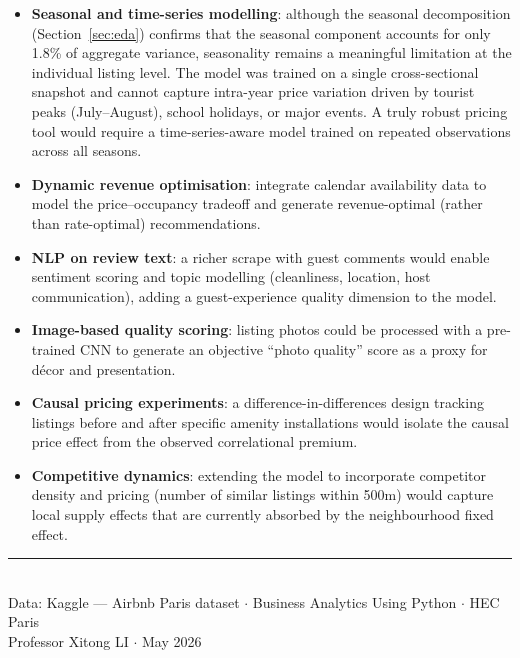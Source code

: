 \documentclass[12pt, a4paper]{article}
\begin{document}
\begin{itemize}[itemsep=4pt]
  \item \textbf{Seasonal and time-series modelling}: although the seasonal decomposition (Section~\ref{sec:eda}) confirms that the seasonal component accounts for only 1.8\% of aggregate variance, seasonality remains a meaningful limitation at the individual listing level. The model was trained on a single cross-sectional snapshot and cannot capture intra-year price variation driven by tourist peaks (July--August), school holidays, or major events. A truly robust pricing tool would require a time-series-aware model trained on repeated observations across all seasons.
  \item \textbf{Dynamic revenue optimisation}: integrate calendar availability data to model the price--occupancy tradeoff and generate revenue-optimal (rather than rate-optimal) recommendations.
  \item \textbf{NLP on review text}: a richer scrape with guest comments would enable sentiment scoring and topic modelling (cleanliness, location, host communication), adding a guest-experience quality dimension to the model.
  \item \textbf{Image-based quality scoring}: listing photos could be processed with a pre-trained CNN to generate an objective ``photo quality'' score as a proxy for décor and presentation.
  \item \textbf{Causal pricing experiments}: a difference-in-differences design tracking listings before and after specific amenity installations would isolate the causal price effect from the observed correlational premium.
  \item \textbf{Competitive dynamics}: extending the model to incorporate competitor density and pricing (number of similar listings within 500m) would capture local supply effects that are currently absorbed by the neighbourhood fixed effect.
\end{itemize}

\vspace{1.2cm}
\begin{center}
  {\color{airbnbCoral}\rule{0.6\textwidth}{1.5pt}}\\[0.4cm]
  {\small\color{airbnbGrey}
    Data: Kaggle --- Airbnb Paris dataset $\cdot$
    Business Analytics Using Python $\cdot$ HEC Paris\\
    Professor Xitong LI $\cdot$ May 2026}
\end{center}
\end{document}
